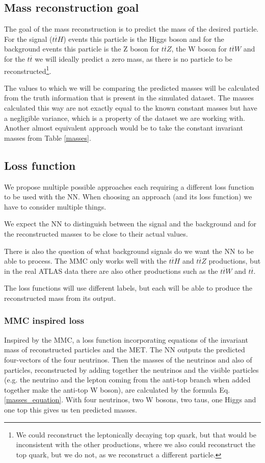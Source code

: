 \documentclass{ctuthesis}
\begin{document}
\subsection{Mass reconstruction goal}
The goal of the mass reconstruction is to predict the mass of the desired particle. For the signal ($t\overline{t}H$) events this particle is the Higgs boson and for the background events this particle is the Z boson for $t\overline{t}Z$, the W boson for $t\overline{t}W$ and for the $t\overline{t}$ we will ideally predict a zero mass, as there is no particle to be reconstructed\footnote{We could reconstruct the leptonically decaying top quark, but that would be inconsistent with the other productions, where we also could reconstruct the top quark, but we do not, as we reconstruct a different particle.}.

The values to which we will be comparing the predicted masses will be calculated from the truth information that is present in the simulated dataset. The masses calculated this way are not exactly equal to the known constant masses but have a negligible variance, which is a property of the dataset we are working with. Another almost equivalent approach would be to take the constant invariant masses from Table \ref{masses}.

\subsection{Loss function}
\label{sec:loss_functions}
We propose multiple possible approaches each requiring a different loss function to be used with the NN. When choosing an approach (and its loss function) we have to consider multiple things.

We expect the NN to distinguish between the signal and the background and for the reconstructed masses to be close to their actual values.

There is also the question of what background signals do we want the NN to be able to process. The MMC only works well with the $t\overline{t}H$ and $t\overline{t}Z$ productions, but in the real ATLAS data there are also other productions such as the $t\overline{t}W$ and $t\overline{t}$.

The loss functions will use different labels, but each will be able to produce the reconstructed mass from its output.

\subsubsection{MMC inspired loss}
Inspired by the MMC, a loss function incorporating equations of the invariant mass of reconstructed particles and the MET. The NN outputs the predicted four-vectors of the four neutrinos. Then the masses of the neutrinos and also of particles, reconstructed by adding together the neutrinos and the visible particles (e.g. the neutrino and the lepton coming from the anti-top branch when added together make the anti-top W boson), are calculated by the formula Eq. \ref{masses_equation}. With four neutrinos, two W bosons, two taus, one Higgs and one top this gives us ten predicted masses.
    
\end{document}
